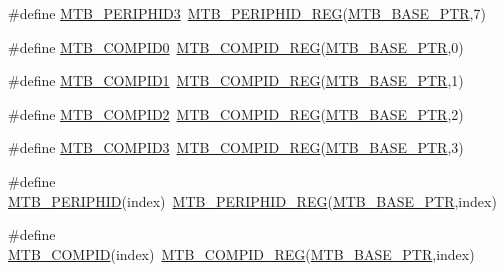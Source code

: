 \begin{DoxyCompactItemize}
\item 
\#define \hyperlink{group___m_t_b___register___accessor___macros_ga7e91dad38910eedaf71d7289c6b51b2f}{M\+T\+B\+\_\+\+P\+E\+R\+I\+P\+H\+I\+D3}~\hyperlink{group___m_t_b___register___accessor___macros_ga1c831bceebde1093b9603f4c5d5001fa}{M\+T\+B\+\_\+\+P\+E\+R\+I\+P\+H\+I\+D\+\_\+\+R\+EG}(\hyperlink{group___m_t_b___peripheral_gadf7f362dfa67354951e6a23ddf08cd73}{M\+T\+B\+\_\+\+B\+A\+S\+E\+\_\+\+P\+TR},7)
\item 
\#define \hyperlink{group___m_t_b___register___accessor___macros_ga901855e16dc139d51b1bf714d6d95f16}{M\+T\+B\+\_\+\+C\+O\+M\+P\+I\+D0}~\hyperlink{group___m_t_b___register___accessor___macros_gaac63d251aca1f616d48a106b19ec2504}{M\+T\+B\+\_\+\+C\+O\+M\+P\+I\+D\+\_\+\+R\+EG}(\hyperlink{group___m_t_b___peripheral_gadf7f362dfa67354951e6a23ddf08cd73}{M\+T\+B\+\_\+\+B\+A\+S\+E\+\_\+\+P\+TR},0)
\item 
\#define \hyperlink{group___m_t_b___register___accessor___macros_ga15d3e8373163542151e15ba67f8796a4}{M\+T\+B\+\_\+\+C\+O\+M\+P\+I\+D1}~\hyperlink{group___m_t_b___register___accessor___macros_gaac63d251aca1f616d48a106b19ec2504}{M\+T\+B\+\_\+\+C\+O\+M\+P\+I\+D\+\_\+\+R\+EG}(\hyperlink{group___m_t_b___peripheral_gadf7f362dfa67354951e6a23ddf08cd73}{M\+T\+B\+\_\+\+B\+A\+S\+E\+\_\+\+P\+TR},1)
\item 
\#define \hyperlink{group___m_t_b___register___accessor___macros_gae583594b06b5ef3ec80b99fa81d38738}{M\+T\+B\+\_\+\+C\+O\+M\+P\+I\+D2}~\hyperlink{group___m_t_b___register___accessor___macros_gaac63d251aca1f616d48a106b19ec2504}{M\+T\+B\+\_\+\+C\+O\+M\+P\+I\+D\+\_\+\+R\+EG}(\hyperlink{group___m_t_b___peripheral_gadf7f362dfa67354951e6a23ddf08cd73}{M\+T\+B\+\_\+\+B\+A\+S\+E\+\_\+\+P\+TR},2)
\item 
\#define \hyperlink{group___m_t_b___register___accessor___macros_ga9bcae33e61ced6f8a480cb42bb9405af}{M\+T\+B\+\_\+\+C\+O\+M\+P\+I\+D3}~\hyperlink{group___m_t_b___register___accessor___macros_gaac63d251aca1f616d48a106b19ec2504}{M\+T\+B\+\_\+\+C\+O\+M\+P\+I\+D\+\_\+\+R\+EG}(\hyperlink{group___m_t_b___peripheral_gadf7f362dfa67354951e6a23ddf08cd73}{M\+T\+B\+\_\+\+B\+A\+S\+E\+\_\+\+P\+TR},3)
\item 
\#define \hyperlink{group___m_t_b___register___accessor___macros_ga5bb7afd7b06403f99e12f9d0af0e9c29}{M\+T\+B\+\_\+\+P\+E\+R\+I\+P\+H\+ID}(index)~\hyperlink{group___m_t_b___register___accessor___macros_ga1c831bceebde1093b9603f4c5d5001fa}{M\+T\+B\+\_\+\+P\+E\+R\+I\+P\+H\+I\+D\+\_\+\+R\+EG}(\hyperlink{group___m_t_b___peripheral_gadf7f362dfa67354951e6a23ddf08cd73}{M\+T\+B\+\_\+\+B\+A\+S\+E\+\_\+\+P\+TR},index)
\item 
\#define \hyperlink{group___m_t_b___register___accessor___macros_ga6ce2196becf81f9e85b957d6b4bbad75}{M\+T\+B\+\_\+\+C\+O\+M\+P\+ID}(index)~\hyperlink{group___m_t_b___register___accessor___macros_gaac63d251aca1f616d48a106b19ec2504}{M\+T\+B\+\_\+\+C\+O\+M\+P\+I\+D\+\_\+\+R\+EG}(\hyperlink{group___m_t_b___peripheral_gadf7f362dfa67354951e6a23ddf08cd73}{M\+T\+B\+\_\+\+B\+A\+S\+E\+\_\+\+P\+TR},index)
\end{DoxyCompactItemize}


